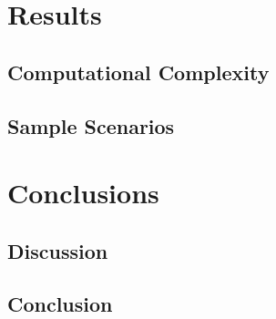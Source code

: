 \documentclass[twocolumn,letterpaper]{IEEEAerospaceCLS}  %
\begin{document}
\section{Results}

\subsection{Computational Complexity}

\subsection{Sample Scenarios}
\section{Conclusions}

\subsection{Discussion}

\subsection{Conclusion}

\appendices               %
\end{document}
